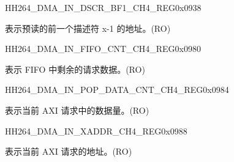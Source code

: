     
    \begin{register}{H}{H264\_DMA\_IN\_DSCR\_BF1\_CH4\_REG}{0x0938}\label{regdesc:H264DMAINDSCRBF1CH4REG}
    \regnewline%
    \begin{regdesc}\begin{reglist}
    \label{fielddesc:H264DMAINLINKDSCRBF1CH4}\item [H264\_DMA\_INLINK\_DSCR\_BF1\_CH4] 表示预读的前一个描述符 x-1 的地址。(RO)
    \end{reglist}\end{regdesc}
    \end{register}
    
    \begin{register}{H}{H264\_DMA\_IN\_FIFO\_CNT\_CH4\_REG}{0x0980}\label{regdesc:H264DMAINFIFOCNTCH4REG}
    \regnewline%
    \begin{regdesc}\begin{reglist}
    \label{fielddesc:H264DMAINCMDFIFOINFIFOCNTCH4}\item [H264\_DMA\_IN\_CMDFIFO\_INFIFO\_CNT\_CH4] 表示 FIFO 中剩余的请求数据。(RO)
    \end{reglist}\end{regdesc}
    \end{register}
    
    
    \begin{register}{H}{H264\_DMA\_IN\_POP\_DATA\_CNT\_CH4\_REG}{0x0984}\label{regdesc:H264DMAINPOPDATACNTCH4REG}
    \regnewline%
    \begin{regdesc}\begin{reglist}
    \label{fielddesc:H264DMAINCMDFIFOPOPDATACNTCH4}\item [H264\_DMA\_IN\_CMDFIFO\_POP\_DATA\_CNT\_CH4] 表示当前 AXI 请求中的数据量。(RO)
    \end{reglist}\end{regdesc}
    \end{register}
    
    
    \begin{register}{H}{H264\_DMA\_IN\_XADDR\_CH4\_REG}{0x0988}\label{regdesc:H264DMAINXADDRCH4REG}
    \regnewline%
    \begin{regdesc}\begin{reglist}
    \label{fielddesc:H264DMAINCMDFIFOXADDRCH4}\item [H264\_DMA\_IN\_CMDFIFO\_XADDR\_CH4] 表示当前 AXI 请求的地址。(RO)
    \end{reglist}\end{regdesc}
    \end{register}
    
